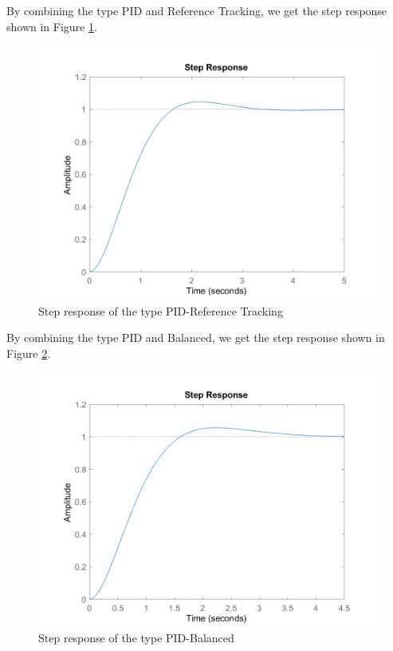 \documentclass[a4paper, twocolumn, titlepage, 10pt]{article}
\begin{document}
		By combining the type PID and Reference Tracking, we get the step response shown in Figure \ref{PID-track-step}.
		\begin{figure}[H]
			\centering
			\includegraphics[width=\linewidth]{PID-track-step}
			\caption{Step response of the type PID-Reference Tracking}
			\label{PID-track-step}
		\end{figure}
		By combining the type PID and Balanced, we get the step response shown in Figure \ref{PID-balance-step}.
		\begin{figure}[H]
			\centering
			\includegraphics[width=\linewidth]{PID-balance-step}
			\caption{Step response of the type PID-Balanced}
			\label{PID-balance-step}
		\end{figure}	
\end{document}
